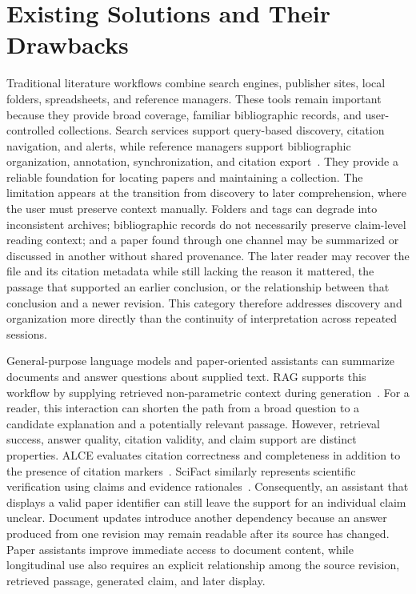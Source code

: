 \section{Existing Solutions and Their Drawbacks}

Traditional literature workflows combine search engines, publisher sites, local folders, spreadsheets, and reference managers.
These tools remain important because they provide broad coverage, familiar bibliographic records, and user-controlled collections.
Search services support query-based discovery, citation navigation, and alerts, while reference managers support bibliographic organization, annotation, synchronization, and citation export~\cite{googleScholarHelp2026,zoteroDocs2026,zoteroSync2026}.
They provide a reliable foundation for locating papers and maintaining a collection.
The limitation appears at the transition from discovery to later comprehension, where the user must preserve context manually.
Folders and tags can degrade into inconsistent archives; bibliographic records do not necessarily preserve claim-level reading context; and a paper found through one channel may be summarized or discussed in another without shared provenance.
The later reader may recover the file and its citation metadata while still lacking the reason it mattered, the passage that supported an earlier conclusion, or the relationship between that conclusion and a newer revision.
This category therefore addresses discovery and organization more directly than the continuity of interpretation across repeated sessions.

General-purpose language models and paper-oriented assistants can summarize documents and answer questions about supplied text.
RAG supports this workflow by supplying retrieved non-parametric context during generation~\cite{lewis2020rag}.
For a reader, this interaction can shorten the path from a broad question to a candidate explanation and a potentially relevant passage.
However, retrieval success, answer quality, citation validity, and claim support are distinct properties.
ALCE evaluates citation correctness and completeness in addition to the presence of citation markers~\cite{gao2023alce}.
SciFact similarly represents scientific verification using claims and evidence rationales~\cite{wadden2020scifact}.
Consequently, an assistant that displays a valid paper identifier can still leave the support for an individual claim unclear.
Document updates introduce another dependency because an answer produced from one revision may remain readable after its source has changed.
Paper assistants improve immediate access to document content, while longitudinal use also requires an explicit relationship among the source revision, retrieved passage, generated claim, and later display.

